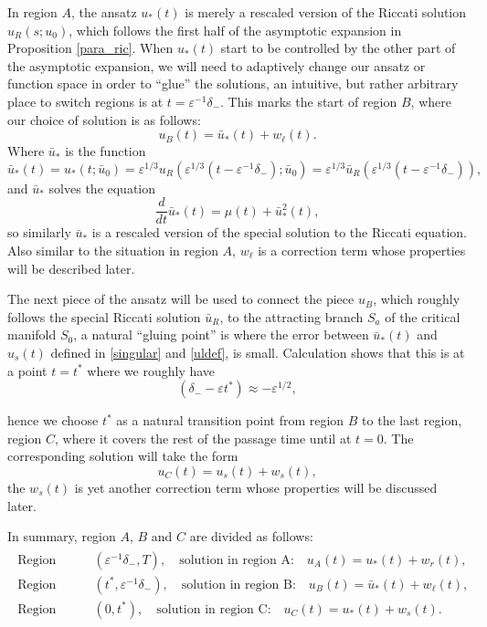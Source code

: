 \documentclass[letterpaper,11pt]{article}
\newcommand{\eps}{\varepsilon}
\numberwithin{equation}{section}
\theoremstyle{plain}
\begin{document}
In region $A$, the ansatz $u_*(t)$ is merely a rescaled version of the Riccati solution $u_R(s; u_0)$, which follows the first half of the asymptotic expansion in Proposition \ref{para_ric}. When $u_*(t)$ start to be controlled by the other part of the asymptotic expansion, we will need to adaptively change our ansatz or function space in order to ``glue'' the solutions, an intuitive, but rather arbitrary place to switch regions is at $t = \eps^{-1} \delta_-$. This marks the start of region $B$, where our choice of solution is as follows:
 \[ 
 u_B(t) = \bar{u}_*(t)  +w_\ell(t).
\]
Where $\bar{u}_*$ is the function
\begin{equation}\label{uldef}
\bar{u}_*(t) = u_*(t;\bar{u}_0) = \eps^{1/3} u_R( \eps^{1/3}(t-\eps^{-1}\delta_-); \bar{u}_0)=\eps^{1/3}\bar{u}_R(\eps^{1/3}(t-\eps^{-1}\delta_-)),
\end{equation}
and $\bar{u}_*$ solves the equation
\begin{equation}\label{uleq}
\frac{d}{dt}\bar{u}_* (t) = \mu(t) + \bar{u}_*^2(t),
\end{equation}
so similarly $\bar{u}_*$ is a rescaled version of the special solution to the Riccati equation. Also similar to the situation in region $A$, $w_\ell$ is a correction term whose properties will be described later.

The next piece of the ansatz will be used to connect the piece $u_B$, which roughly follows the special Riccati solution $\bar{u}_R$, to the attracting branch $S_a$ of the critical manifold $S_0$, a natural ``gluing point'' is where the error between $\bar{u}_*(t)$ and $u_s(t)$ defined in \eqref{singular} and \eqref{uldef}, is small. Calculation shows that this is at a point $t=t^*$ where we roughly have
\begin{equation}
(\delta_- - \eps t^*) \approx -\eps^{1/2},
\end{equation} 

hence we choose $t^*$ as a natural transition point from region $B$ to the last region, region $C$, where it covers the rest of the passage time until at $t=0$. The corresponding solution will take the form
\[
u_C(t) = u_s(t) + w_s(t),
\]
the $w_s(t)$ is yet another correction term whose properties will be discussed later. 

In summary, region $A$, $B$ and $C$ are divided as follows:
\begin{align}\label{region_division_t}
\begin{split}
\text{Region A:} & \quad (\eps^{-1}\delta_-, T), \quad \text{solution in region A:} \quad u_A(t) = u_*(t)+w_r(t), \\
\text{Region B:} & \quad (t^*, \eps^{-1}\delta_-), \quad \text{solution in region B:} \quad u_B(t) = \bar{u}_*(t)+w_\ell(t),  \\
\text{Region C:} & \quad (0, t^*), \quad \text{solution in region C:} \quad u_C(t) = u_*(t)+w_s(t).
\end{split}
\end{align}
\end{document}
